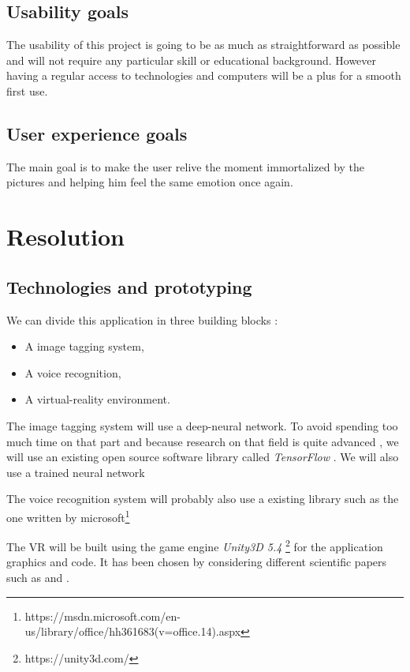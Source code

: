 \documentclass[11pt,a4paper]{article}
\begin{document}
\subsection{Usability goals}

The usability of this project is going to be as much as straightforward as possible and will not require any particular skill or educational background. However having a regular access to technologies and computers will be a plus for a smooth first use. 

\subsection{User experience goals}

The main goal is to make the user relive the moment immortalized by the pictures and helping him feel the same emotion once again.

\section{Resolution}

\subsection{Technologies and prototyping}

We can divide this application in three building blocks :
\begin{itemize}
	\item A image tagging system,
	\item A voice recognition,
	\item A virtual-reality environment.
\end{itemize}

The image tagging system will use a deep-neural network. To avoid spending too much time on that part and because research on that field is quite advanced , we will use an existing open source software library called \textit{TensorFlow} . We will also use a trained neural network 

The voice recognition system will probably also use a existing library such as the one written by microsoft\footnote{https://msdn.microsoft.com/en-us/library/office/hh361683(v=office.14).aspx}

The VR will be built using the game engine \textit{Unity3D 5.4} \footnote{https://unity3d.com/} for the application graphics and code. It has been chosen by considering different scientific papers such as \cite{Mazuryk1996} and \cite{calado2013virtual}.
\end{document}

